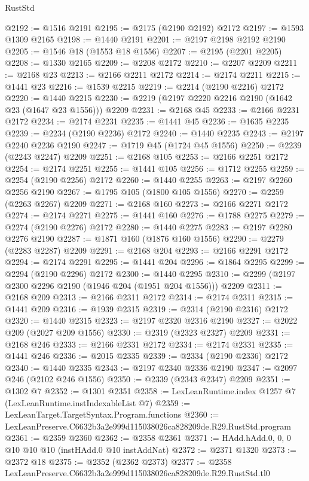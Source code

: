 \begin{lexlean}{RustStd}
\begin{coremodule}
@2192 := @1516 @2191
@2195 := @2175 (@2190 @2192) @2172
@2197 := @1593 @1309 @2165
@2198 := @1440 @2191
@2201 := @2197 @2198 @2192 @2190
@2205 := @1546 @18 (@1553 @18 @1556)
@2207 := @2195 (@2201 @2205)
@2208 := @1330 @2165
@2209 := @2208 @2172
@2210 := @2207 @2209
@2211 := @2168 @23
@2213 := @2166 @2211 @2172
@2214 := @2174 @2211
@2215 := @1441 @23
@2216 := @1539 @2215
@2219 := @2214 (@2190 @2216) @2172
@2220 := @1440 @2215
@2230 := @2219 (@2197 @2220 @2216 @2190 (@1642 @23 (@1647 @23 @1556))) @2209
@2231 := @2168 @45
@2233 := @2166 @2231 @2172
@2234 := @2174 @2231
@2235 := @1441 @45
@2236 := @1635 @2235
@2239 := @2234 (@2190 @2236) @2172
@2240 := @1440 @2235
@2243 := @2197 @2240 @2236 @2190
@2247 := @1719 @45 (@1724 @45 @1556)
@2250 := @2239 (@2243 @2247) @2209
@2251 := @2168 @105
@2253 := @2166 @2251 @2172
@2254 := @2174 @2251
@2255 := @1441 @105
@2256 := @1712 @2255
@2259 := @2254 (@2190 @2256) @2172
@2260 := @1440 @2255
@2263 := @2197 @2260 @2256 @2190
@2267 := @1795 @105 (@1800 @105 @1556)
@2270 := @2259 (@2263 @2267) @2209
@2271 := @2168 @160
@2273 := @2166 @2271 @2172
@2274 := @2174 @2271
@2275 := @1441 @160
@2276 := @1788 @2275
@2279 := @2274 (@2190 @2276) @2172
@2280 := @1440 @2275
@2283 := @2197 @2280 @2276 @2190
@2287 := @1871 @160 (@1876 @160 @1556)
@2290 := @2279 (@2283 @2287) @2209
@2291 := @2168 @204
@2293 := @2166 @2291 @2172
@2294 := @2174 @2291
@2295 := @1441 @204
@2296 := @1864 @2295
@2299 := @2294 (@2190 @2296) @2172
@2300 := @1440 @2295
@2310 := @2299 (@2197 @2300 @2296 @2190 (@1946 @204 (@1951 @204 @1556))) @2209
@2311 := @2168 @209
@2313 := @2166 @2311 @2172
@2314 := @2174 @2311
@2315 := @1441 @209
@2316 := @1939 @2315
@2319 := @2314 (@2190 @2316) @2172
@2320 := @1440 @2315
@2323 := @2197 @2320 @2316 @2190
@2327 := @2022 @209 (@2027 @209 @1556)
@2330 := @2319 (@2323 @2327) @2209
@2331 := @2168 @246
@2333 := @2166 @2331 @2172
@2334 := @2174 @2331
@2335 := @1441 @246
@2336 := @2015 @2335
@2339 := @2334 (@2190 @2336) @2172
@2340 := @1440 @2335
@2343 := @2197 @2340 @2336 @2190
@2347 := @2097 @246 (@2102 @246 @1556)
@2350 := @2339 (@2343 @2347) @2209
@2351 := @1302 @7
@2352 := @1301 @2351
@2358 := LexLeanRuntime.index @1257 @7 (LexLeanRuntime.instIndexableList @7)
@2359 := LexLeanTarget.TargetSyntax.Program.functions
@2360 := LexLeanPreserve.C6632b3a2e999d115038026ca828209de.R29.RustStd.program
@2361 := @2359 @2360
@2362 := @2358 @2361
@2371 := HAdd.hAdd.{0, 0, 0} @10 @10 @10 (instHAdd.{0} @10 instAddNat)
@2372 := @2371 @1320
@2373 := @2372 @18
@2375 := @2352 (@2362 @2373)
@2377 := @2358 LexLeanPreserve.C6632b3a2e999d115038026ca828209de.R29.RustStd.tl0

\end{coremodule}
\end{lexlean}
